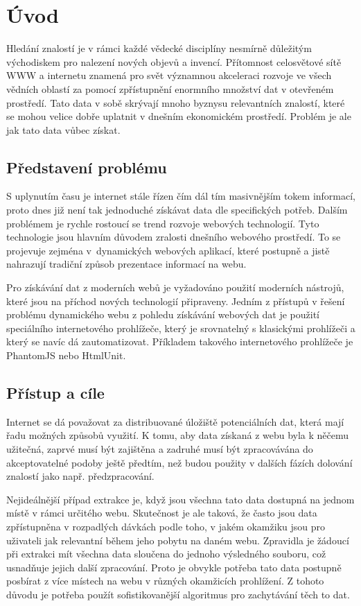 \documentclass[11pt,a4paper]{article}
\begin{document}
\section{Úvod}
Hledání znalostí je v rámci každé vědecké disciplíny nesmírně důležitým východiskem pro nalezení nových objevů a invencí. Přítomnost celosvětové sítě WWW a internetu znamená pro svět významnou akceleraci rozvoje ve všech vědních oblastí za pomocí zpřístupnění enormního množství dat v otevřeném prostředí. Tato data v sobě skrývají mnoho byznysu relevantních znalostí, které se mohou velice dobře uplatnit v dnešním ekonomickém prostředí. Problém je ale jak tato data vůbec získat.

\subsection{Představení problému}
S uplynutím času je internet stále řízen čím dál tím masivnějším tokem informací, proto dnes již není tak jednoduché získávat data dle specifických potřeb. Dalším problémem je rychle rostoucí se trend rozvoje webových technologií. Tyto technologie jsou hlavním důvodem zralosti dnešního webového prostředí. To se projevuje zejména v~dynamických webových aplikací, které postupně a jistě nahrazují tradiční způsob prezentace informací na webu. 

Pro získávání dat z moderních webů je vyžadováno použití moderních nástrojů, které jsou na příchod nových technologií připraveny. Jedním z přístupů v řešení problému dynamického webu z pohledu získávání webových dat je použití speciálního internetového prohlížeče, který je srovnatelný s klasickými prohlížeči a který se navíc dá zautomatizovat. Příkladem takového internetového prohlížeče je PhantomJS\cite{phantomjs} nebo HtmlUnit.

\subsection{Přístup a cíle}
Internet se dá považovat za distribuované úložiště potenciálních dat, která mají řadu možných způsobů využití. K tomu, aby data získaná z webu byla k něčemu užitečná, zaprvé musí být zajištěna a zadruhé musí být zpracovávána do akceptovatelné podoby ještě předtím, než budou použity v dalších fázích dolování znalostí jako např. předzpracování. 

Nejideálnější případ extrakce je, když jsou všechna tato data dostupná na jednom místě v rámci určitého webu. Skutečnost je ale taková, že často jsou data zpřístupněna v rozpadlých dávkách podle toho, v jakém okamžiku jsou pro uživateli jak relevantní během jeho pobytu na daném webu. Zpravidla je žádoucí při extrakci mít všechna data sloučena do jednoho výsledného souboru, což usnadňuje jejich další zpracování. Proto je obvykle potřeba tato data postupně posbírat z více místech na webu v různých okamžicích prohlížení. Z tohoto důvodu je potřeba použít sofistikovanější algoritmus pro zachytávání těch to dat.
\end{document}
